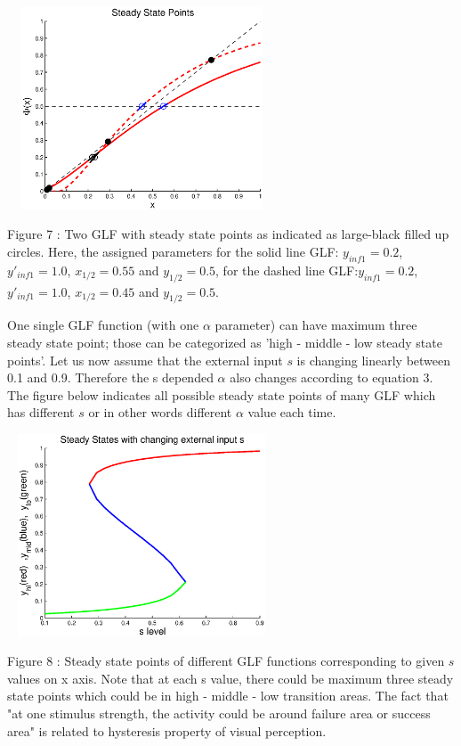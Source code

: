 \documentclass[twocolumn]{article}
\begin{document}
\begin{center}
\includegraphics[width=80mm,height=60mm]{steady_state.eps} 
   \begin{footnotesize} Figure 7 : Two GLF with steady state points as indicated as large-black filled up circles. Here, the assigned parameters for the solid line GLF: $y_{inf1}=0.2$, $y'_{inf1}=1.0$, $x_{1/2}=0.55$ and $y_{1/2}=0.5$, for the dashed line GLF:$y_{inf1}=0.2$, $y'_{inf1}=1.0$, $x_{1/2}=0.45$ and $y_{1/2}=0.5$.  \end{footnotesize}
\end{center}

 One single GLF function (with one $\alpha$ parameter) can have maximum three steady state point; those can be categorized as 'high - middle - low steady state points'. Let us now assume that the external input $s$ is changing linearly between 0.1 and 0.9. Therefore the s depended $\alpha$ also changes according to equation 3. The figure below indicates all possible steady state points of many GLF which has different $s$ or in other words different $\alpha$ value each time. 

\begin{center}
\includegraphics[width=80mm,height=60mm]{s_vs_steadystate.eps} 
   \begin{footnotesize} Figure 8 : Steady state points of different GLF functions corresponding to given $s$ values on x axis. Note that at each s value, there could be maximum three steady state points which could be in high - middle - low transition areas. The fact that "at one stimulus strength, the activity could be around failure area or success area" is related to hysteresis property of visual perception.  \end{footnotesize}
\end{center}
\end{document}
